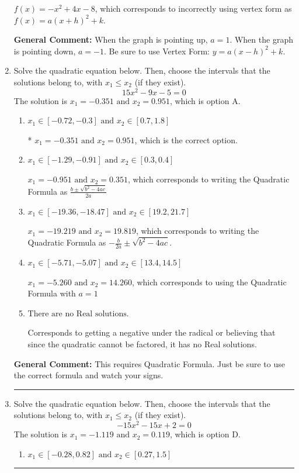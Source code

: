 \documentclass{extbook}[14pt]
\newcommand{\litem}[1]{\item #1

\rule{\textwidth}{0.4pt}}
\begin{document}
\begin{enumerate}
{\begin{enumerate}[label=\Alph*.]
$f(x)=-x^{2} +4 x -8$, which corresponds to incorrectly using vertex form as $f(x) = a(x+h)^2+k$.
\end{enumerate}

\textbf{General Comment:} When the graph is pointing up, $a=1$. When the graph is pointing down, $a=-1$. Be sure to use Vertex Form: $y = a(x-h)^2+k$.
}
\litem{
Solve the quadratic equation below. Then, choose the intervals that the solutions belong to, with $x_1 \leq x_2$ (if they exist).
\[ 15x^{2} -9 x -5 = 0 \]
The solution is \( x_1 = -0.351 \text{ and } x_2 = 0.951 \), which is option A.\begin{enumerate}[label=\Alph*.]
\item \( x_1 \in [-0.72, -0.3] \text{ and } x_2 \in [0.7, 1.8] \)

* $x_1 = -0.351 \text{ and } x_2 = 0.951$, which is the correct option.
\item \( x_1 \in [-1.29, -0.91] \text{ and } x_2 \in [0.3, 0.4] \)

 $x_1 = -0.951 \text{ and } x_2 = 0.351$, which corresponds to writing the Quadratic Formula as $\frac{b \pm \sqrt{b^2 - 4ac}}{2a}$
\item \( x_1 \in [-19.36, -18.47] \text{ and } x_2 \in [19.2, 21.7] \)

 $x_1 = -19.219 \text{ and } x_2 = 19.819$, which corresponds to writing the Quadratic Formula as $-\frac{b}{2a} \pm \sqrt{b^2 - 4ac}$.
\item \( x_1 \in [-5.71, -5.07] \text{ and } x_2 \in [13.4, 14.5] \)

 $x_1 = -5.260 \text{ and } x_2 = 14.260$, which corresponds to using the Quadratic Formula with $a=1$
\item \( \text{There are no Real solutions.} \)

Corresponds to getting a negative under the radical or believing that since the quadratic cannot be factored, it has no Real solutions.
\end{enumerate}

\textbf{General Comment:} This requires Quadratic Formula. Just be sure to use the correct formula and watch your signs.
}
\litem{
Solve the quadratic equation below. Then, choose the intervals that the solutions belong to, with $x_1 \leq x_2$ (if they exist).
\[ -15x^{2} -15 x + 2 = 0 \]
The solution is \( x_1 = -1.119 \text{ and } x_2 = 0.119 \), which is option D.\begin{enumerate}[label=\Alph*.]
\item \( x_1 \in [-0.28, 0.82] \text{ and } x_2 \in [0.27, 1.5] \)


\end{enumerate}}
\end{enumerate}
\end{document}
